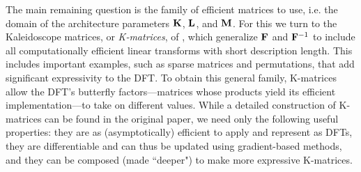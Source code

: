 The main remaining question is the family of efficient matrices to use, i.e. the domain of the architecture parameters $\mathbf{K}$, $\mathbf{L}$, and $\mathbf{M}$.
For this we turn to the Kaleidoscope matrices, or {\em K-matrices}, of \citet{dao2020kaleidoscope}, which generalize $\mathbf{F}$ and $\mathbf{F}^{-1}$ to include all computationally efficient linear transforms with short description length.
This includes important examples, such as sparse matrices and permutations, that add significant expressivity to the DFT.
To obtain this general family, K-matrices allow the DFT's butterfly factors---matrices whose products yield its efficient implementation---to take on different values.
While a detailed construction of K-matrices can be found in the original paper, we need only the following useful properties: 
they are as (asymptotically) efficient to apply and represent as DFTs, they are differentiable and can thus be updated using gradient-based methods, and they can be composed (made ``deeper") to make more expressive K-matrices.

